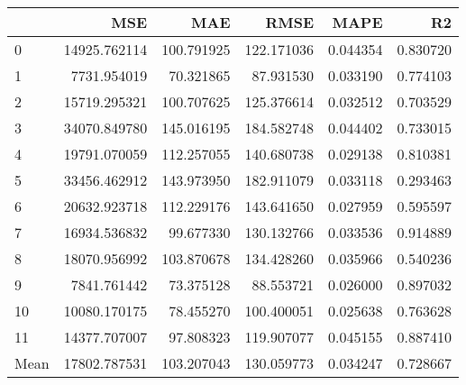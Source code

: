 \begin{tabular}{lrrrrr}
\toprule
 & MSE & MAE & RMSE & MAPE & R2 \\
\midrule
0 & 14925.762114 & 100.791925 & 122.171036 & 0.044354 & 0.830720 \\
1 & 7731.954019 & 70.321865 & 87.931530 & 0.033190 & 0.774103 \\
2 & 15719.295321 & 100.707625 & 125.376614 & 0.032512 & 0.703529 \\
3 & 34070.849780 & 145.016195 & 184.582748 & 0.044402 & 0.733015 \\
4 & 19791.070059 & 112.257055 & 140.680738 & 0.029138 & 0.810381 \\
5 & 33456.462912 & 143.973950 & 182.911079 & 0.033118 & 0.293463 \\
6 & 20632.923718 & 112.229176 & 143.641650 & 0.027959 & 0.595597 \\
7 & 16934.536832 & 99.677330 & 130.132766 & 0.033536 & 0.914889 \\
8 & 18070.956992 & 103.870678 & 134.428260 & 0.035966 & 0.540236 \\
9 & 7841.761442 & 73.375128 & 88.553721 & 0.026000 & 0.897032 \\
10 & 10080.170175 & 78.455270 & 100.400051 & 0.025638 & 0.763628 \\
11 & 14377.707007 & 97.808323 & 119.907077 & 0.045155 & 0.887410 \\
Mean & 17802.787531 & 103.207043 & 130.059773 & 0.034247 & 0.728667 \\
\bottomrule
\end{tabular}
